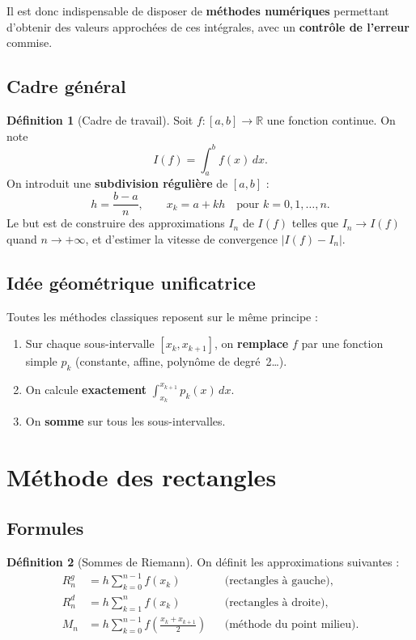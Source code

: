 \documentclass[a4paper,12pt]{article}
\theoremstyle{definition}
\newtheorem{definition}{Définition}[section]
\theoremstyle{plain}
\theoremstyle{remark}
\newcommand{\R}{\mathbb{R}}
\begin{document}
Il est donc indispensable de disposer de \textbf{méthodes numériques} permettant d'obtenir des valeurs approchées de ces intégrales, avec un \textbf{contrôle de l'erreur} commise.

\subsection{Cadre général}

\begin{definition}[Cadre de travail]
Soit $f : [a,b] \to \R$ une fonction continue. On note
\[
  I(f) = \int_a^b f(x)\,dx.
\]
On introduit une \textbf{subdivision régulière} de $[a,b]$ :
\[
  h = \frac{b-a}{n}, \qquad x_k = a + kh \quad \text{pour } k = 0, 1, \ldots, n.
\]
Le but est de construire des approximations $I_n$ de $I(f)$ telles que $I_n \to I(f)$ quand $n \to +\infty$, et d'estimer la vitesse de convergence $|I(f) - I_n|$.
\end{definition}

\subsection{Idée géométrique unificatrice}

Toutes les méthodes classiques reposent sur le même principe :
\begin{enumerate}
  \item Sur chaque sous-intervalle $[x_k, x_{k+1}]$, on \textbf{remplace} $f$ par une fonction simple $p_k$ (constante, affine, polynôme de degré~2\ldots).
  \item On calcule \textbf{exactement} $\int_{x_k}^{x_{k+1}} p_k(x)\,dx$.
  \item On \textbf{somme} sur tous les sous-intervalles.
\end{enumerate}

\section{Méthode des rectangles}

\subsection{Formules}

\begin{definition}[Sommes de Riemann]
On définit les approximations suivantes :
\begin{align}
  R_n^g &= h \sum_{k=0}^{n-1} f(x_k) & &\text{(rectangles à gauche)}, \label{eq:rect_gauche}\\[6pt]
  R_n^d &= h \sum_{k=1}^{n} f(x_k) & &\text{(rectangles à droite)}, \label{eq:rect_droite}\\[6pt]
  M_n &= h \sum_{k=0}^{n-1} f\!\left(\frac{x_k + x_{k+1}}{2}\right) & &\text{(méthode du point milieu)}. \label{eq:point_milieu}
\end{align}
\end{definition}
\end{document}
